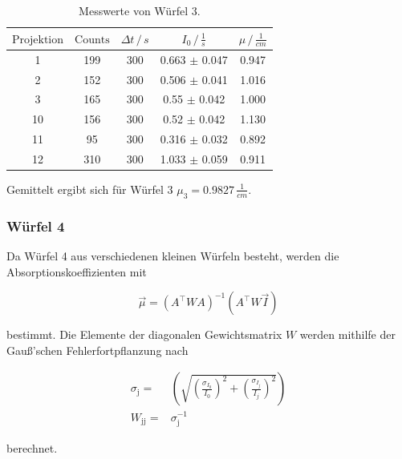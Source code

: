 \begin{table}
\centering
{}
\begin{tabular}{c c c c c}
\toprule
$\text{Projektion}$ & $\text{Counts}$ & $\Delta t \,/\, s $ & $I_0 \,/\, \frac{1}{s} $ & $\mu \,/\, \frac{1}{cm} $\\
 \midrule 
 1 & 199  & 300 & 0.663 $\pm$ 0.047 & 0.947  \\
 2 & 152  & 300 & 0.506 $\pm$ 0.041 & 1.016  \\
 3 & 165  & 300 & 0.55 $\pm$ 0.042  & 1.000 \\
 10 & 156 & 300& 0.52 $\pm$  0.042  & 1.130 \\
 11 & 95  & 300& 0.316 $\pm$ 0.032  & 0.892 \\
 12 & 310 & 300& 1.033 $\pm$ 0.059  & 0.911 \\
\bottomrule
\end{tabular}
\caption{Messwerte von Würfel 3.}
\label{tab:w3}
\end{table}

\noindent
Gemittelt ergibt sich für Würfel 3 $\mu_3 = 0.9827 \, \frac{1}{cm}$.

\subsubsection{Würfel 4}




    \noindent
    Da Würfel 4 aus verschiedenen kleinen Würfeln besteht, werden die Absorptionskoeffizienten mit
  
  \begin{equation}
  \vec{\mu} = ( A^\top W A)^{-1}(A^\top W \vec{I})
  \label{eqn:mu4}
  \end{equation}
  
  \noindent
  bestimmt.
  Die Elemente der diagonalen Gewichtsmatrix $W$ werden mithilfe der Gauß'schen Fehlerfortpflanzung nach
  
    \begin{align*}
        \sigma_{\text{j}}=& \left(\sqrt{\left(\frac{\sigma_{I_0}}{I_0}\right)^2+ \left(\frac{\sigma_{I_j}}{I_j}\right)^2}\right)\\
        W_{\text{jj}}=& \sigma_{\text{j}}^{-1}
    \end{align*}
    
    \noindent
    berechnet.

